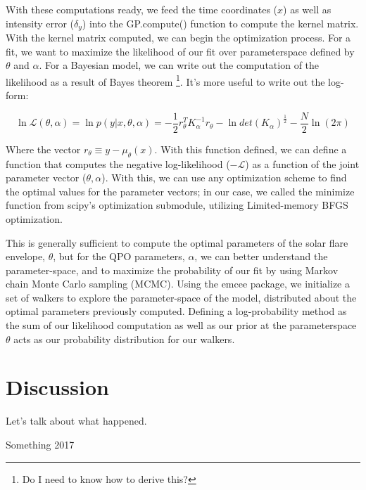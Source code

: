 \documentclass{aastex61}
\begin{document}
With these computations ready, we feed the time coordinates ($x$) as well as intensity error ($\delta_y$) into the GP.compute() function to compute the kernel matrix.
With the kernel matrix computed, we can begin the optimization process. For a fit, we want to maximize the likelihood of our fit over parameterspace defined by $\theta$ and $\alpha$. 
For a Bayesian model, we can write out the computation of the likelihood as a result of Bayes theorem \footnote{Do I need to know how to derive this?}. It's more useful to write out the log-form:

\begin{equation}
	\ln \mathcal{L}(\theta, \alpha) = \ln p(y|x, \theta, \alpha) = -\frac{1}{2}r_\theta^T K_\alpha^{-1}r_\theta - \ln det(K_\alpha)^{\frac{1}{2}} - \frac{N}{2}\ln(2 \pi)
	\label{loglike}
\end{equation}

Where the vector $r_\theta \equiv y-\mu_\theta (x)$. With this function defined, we can define a function that computes the negative log-likelihood ($-\mathcal{L}$) as a function of the joint parameter vector ($\theta, \alpha$).
With this, we can use any optimization scheme to find the optimal values for the parameter vectors; in our case, we called the minimize function from scipy's optimization submodule, utilizing Limited-memory BFGS optimization.

This is generally sufficient to compute the optimal parameters of the solar flare envelope, $\theta$, but for the QPO parameters, $\alpha$, we can better understand the parameter-space, and to maximize the probability of our fit by using Markov chain Monte Carlo sampling (MCMC).
Using the emcee package, we initialize a set of walkers to explore the parameter-space of the model, distributed about the optimal parameters previously computed. Defining a log-probability method as the sum of our likelihood computation as well as our prior at the parameterspace $\theta$ acts as our probability distribution for our walkers.


\section{Discussion} \label{sec:discussion}
Let's talk about what happened.





\begin{thebibliography}{}
	Something 2017
\end{thebibliography}
\end{document}
